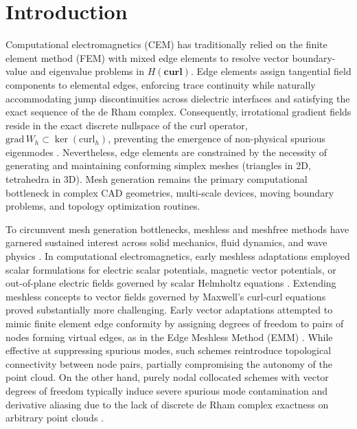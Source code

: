 \documentclass[preprint,12pt]{elsarticle}
\begin{document}

\section{Introduction}
\label{sec:introduction}

Computational electromagnetics (CEM) has traditionally relied on the finite element method (FEM) with mixed edge elements \cite{nedelec1980mixed, monk2003finite, jin2014finite} to resolve vector boundary-value and eigenvalue problems in $H(\mathbf{curl})$. Edge elements assign tangential field components to elemental edges, enforcing trace continuity while naturally accommodating jump discontinuities across dielectric interfaces and satisfying the exact sequence of the de Rham complex. Consequently, irrotational gradient fields reside in the exact discrete nullspace of the curl operator, $\mathrm{grad} \, W_h \subset \ker(\mathrm{curl}_h)$, preventing the emergence of non-physical spurious eigenmodes \cite{bossavit1998computational, boffi2006finite}. Nevertheless, edge elements are constrained by the necessity of generating and maintaining conforming simplex meshes (triangles in 2D, tetrahedra in 3D). Mesh generation remains the primary computational bottleneck in complex CAD geometries, multi-scale devices, moving boundary problems, and topology optimization routines.

To circumvent mesh generation bottlenecks, meshless and meshfree methods have garnered sustained interest across solid mechanics, fluid dynamics, and wave physics \cite{belytschko2023meshfree, liu2009mesh, fasshauer2007meshfree, atluri2004meshless}. In computational electromagnetics, early meshless adaptations employed scalar formulations for electric scalar potentials, magnetic vector potentials, or out-of-plane electric fields governed by scalar Helmholtz equations \cite{viana1999moving, ho2001moving, parreira2006element, nicomedes2012meshless}. Extending meshless concepts to vector fields governed by Maxwell's curl-curl equations proved substantially more challenging. Early vector adaptations attempted to mimic finite element edge conformity by assigning degrees of freedom to pairs of nodes forming virtual edges, as in the Edge Meshless Method (EMM) \cite{lima2017edge}. While effective at suppressing spurious modes, such schemes reintroduce topological connectivity between node pairs, partially compromising the autonomy of the point cloud. On the other hand, purely nodal collocated schemes with vector degrees of freedom typically induce severe spurious mode contamination and derivative aliasing due to the lack of discrete de Rham complex exactness on arbitrary point clouds \cite{bossavit1990spurious, boffi2006finite}.
\end{document}
